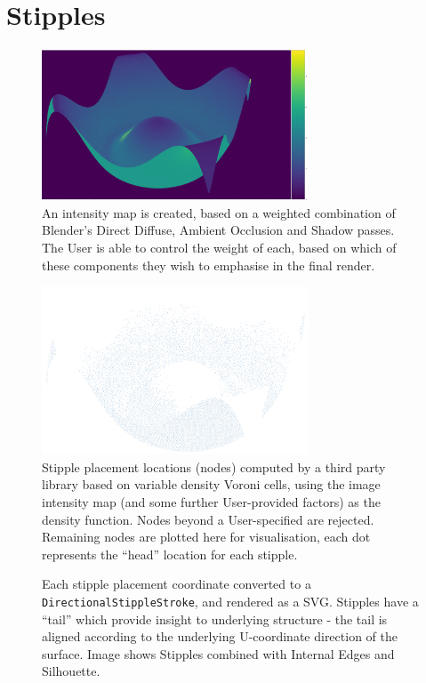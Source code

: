 \FloatBarrier
\section{Stipples}\label{impl_stipples}
\begin{figure}[h!]
	\centering
	\includegraphics[height=4.5cm]{images/stipple_intensity.png}
	\caption{An intensity map is created, based on a weighted combination of Blender's Direct Diffuse, Ambient Occlusion and Shadow passes. The User is able to control the weight of each, based on which of these components they wish to emphasise in the final render.}\label{stipple_intensity}
\end{figure}

\begin{figure}[h!]
	\centering
	\includegraphics[height=5cm]{images/stipple_placement.png}
	\caption{Stipple placement locations (nodes) computed by a third party library based on variable density Voroni cells, using the image intensity map (and some further User-provided factors) as the density function. Nodes beyond a User-specified are rejected. Remaining nodes are plotted here for visualisation, each dot represents the ``head'' location for each stipple.}\label{stipple_placement}
\end{figure}

\begin{figure}[h!]
	\centering
	
	\caption{Each stipple placement coordinate converted to a \texttt{DirectionalStippleStroke}, and rendered as a SVG. Stipples have a ``tail'' which provide insight to underlying structure - the tail is aligned according to the underlying U-coordinate direction of the surface. Image shows Stipples combined with Internal Edges and Silhouette.}\label{stipple}
\end{figure}

